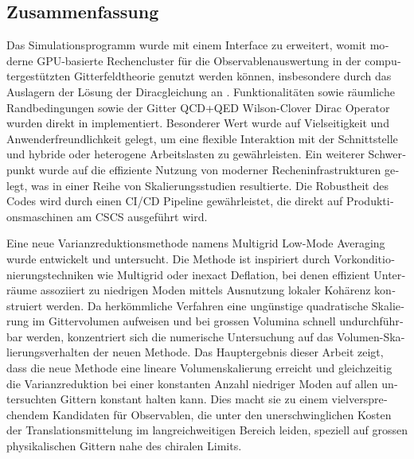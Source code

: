 \begin{otherlanguage}{ngerman}
\chapter*{Zusammenfassung}

Das Simulationsprogramm \openqxd wurde mit einem Interface zu \quda erweitert, womit moderne GPU-basierte Rechencluster für die Observablenauswertung in der computergestützten Gitterfeldtheorie genutzt werden können, insbesondere durch das Auslagern der Lösung der Diracgleichung an \quda.
Funktionalitäten sowie räumliche \Cstar Randbedingungen sowie der Gitter QCD+QED Wilson-Clover Dirac Operator wurden direkt in \quda implementiert.
Besonderer Wert wurde auf Vielseitigkeit und Anwenderfreundlichkeit gelegt, um eine flexible Interaktion mit der Schnittstelle und hybride oder heterogene Arbeitslasten zu gewährleisten.
Ein weiterer Schwerpunkt wurde auf die effiziente Nutzung von moderner Recheninfrastrukturen gelegt, was in einer Reihe von Skalierungsstudien resultierte.
Die Robustheit des Codes wird durch einen CI/CD Pipeline gewährleistet, die direkt auf Produktionsmaschinen am CSCS ausgeführt wird.

Eine neue Varianzreduktionsmethode namens Multigrid Low-Mode Averaging wurde entwickelt und untersucht.
Die Methode ist inspiriert durch Vorkonditionierungstechniken wie Multigrid oder inexact Deflation, bei denen effizient Unterräume assoziiert zu niedrigen Moden mittels Ausnutzung lokaler Kohärenz konstruiert werden.
Da herkömmliche Verfahren eine ungünstige quadratische Skalierung im Gittervolumen aufweisen und bei grossen Volumina schnell undurchführbar werden, konzentriert sich die numerische Untersuchung auf das Volumen-Skalierungsverhalten der neuen Methode.
Das Hauptergebnis dieser Arbeit zeigt, dass die neue Methode eine lineare Volumenskalierung erreicht und gleichzeitig die Varianzreduktion bei einer konstanten Anzahl niedriger Moden auf allen untersuchten Gittern konstant halten kann.
Dies macht sie zu einem vielversprechendem Kandidaten für Observablen,
die unter den unerschwinglichen Kosten der Translationsmittelung im langreichweitigen Bereich leiden,
speziell auf grossen physikalischen Gittern nahe des chiralen Limits.

\end{otherlanguage}

\endgroup

\vfill